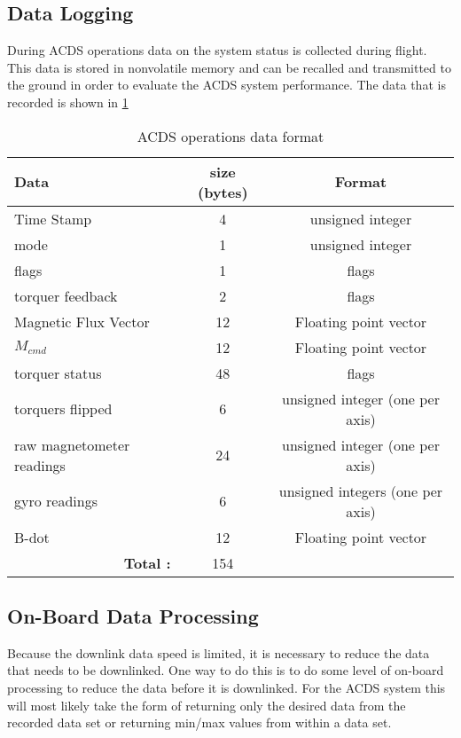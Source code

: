 \subsection{Data Logging}

During \ac{ACDS} operations data on the system status is collected during flight. This data is stored in nonvolatile memory and can be recalled and transmitted to the ground in order to evaluate the \ac{ACDS} system performance. The data that is recorded is shown in \cref{tab:logdat}

\begin{table}[H]
    \centering
    \caption{\ac{ACDS} operations data format}
    \label{tab:logdat}
    \begin{tabular}{|l|c|c|}
        \hline
        Data&size (bytes)&Format\\
        \hline
        Time Stamp&4&unsigned integer\\
        \hline
        mode&1&unsigned integer\\
        \hline
        flags&1&flags\\
        \hline
        torquer feedback&2&flags\\
        \hline
        Magnetic Flux Vector&12&Floating point vector\\
        \hline
        $M_{cmd}$&12&Floating point vector\\
        \hline
        torquer status&48&flags\\
        \hline
        torquers flipped&6&unsigned integer (one per axis)\\
        \hline
        raw magnetometer readings&24&unsigned integer (one per axis)\\
        \hline
        gyro readings&6&unsigned integers (one per axis)\\
        \hline
        B-dot&12&Floating point vector\\
        \hline
        \multicolumn{1}{|r|}{\bfseries Total :}&154&\\
        \hline
    \end{tabular}
\end{table}

\subsection{On-Board Data Processing}

Because the downlink data speed is limited, it is necessary to reduce the data that needs to be downlinked. One way to do this is to do some level of on-board processing to reduce the data before it is downlinked. For the \ac{ACDS} system this will most likely take the form of returning only the desired data from the recorded data set or returning min/max values from within a data set. 

